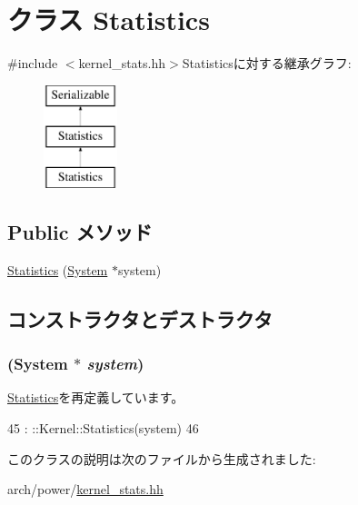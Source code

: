 \hypertarget{classPowerISA_1_1Kernel_1_1Statistics}{
\section{クラス Statistics}
\label{classPowerISA_1_1Kernel_1_1Statistics}
}


{\ttfamily \#include $<$kernel\_\-stats.hh$>$}Statisticsに対する継承グラフ:\begin{figure}[H]
\begin{center}
\leavevmode
\includegraphics[height=3cm]{classPowerISA_1_1Kernel_1_1Statistics}
\end{center}
\end{figure}
\subsection*{Public メソッド}
\begin{DoxyCompactItemize}
\item 
\hyperlink{classPowerISA_1_1Kernel_1_1Statistics_a83aac6d65afe578fbf92b926ce7c1c3c}{Statistics} (\hyperlink{classSystem}{System} $\ast$system)
\end{DoxyCompactItemize}


\subsection{コンストラクタとデストラクタ}
\hypertarget{classPowerISA_1_1Kernel_1_1Statistics_a83aac6d65afe578fbf92b926ce7c1c3c}{
\subsubsection[{Statistics}]{ ({\bf System} $\ast$ {\em system})}}
\label{classPowerISA_1_1Kernel_1_1Statistics_a83aac6d65afe578fbf92b926ce7c1c3c}


\hyperlink{classKernel_1_1Statistics_a83aac6d65afe578fbf92b926ce7c1c3c}{Statistics}を再定義しています。


\begin{DoxyCode}
45                                : ::Kernel::Statistics(system)
46     {}
\end{DoxyCode}


このクラスの説明は次のファイルから生成されました:\begin{DoxyCompactItemize}
\item 
arch/power/\hyperlink{arch_2power_2kernel__stats_8hh}{kernel\_\-stats.hh}\end{DoxyCompactItemize}

